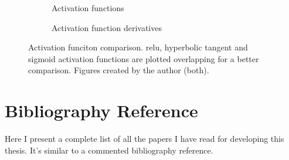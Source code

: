 \begin{figure}[p]
  \centering
  \begin{subfigure}[b]{.475\textwidth}
    \centering
    \caption{Activation functions}
  \end{subfigure}\hfill
  \begin{subfigure}[b]{.475\textwidth}
    \centering
    \caption{Activation function derivatives}
  \end{subfigure}
  \caption[Activation funciton comparison]{Activation funciton
    comparison. \Acf{relu}, hyperbolic tangent and sigmoid activation functions
    are plotted overlapping for a better comparison. Figures created by the
    author (both).}%
  \label{fig:activation-functions}
\end{figure}



















\section{Bibliography Reference}


Here I present a complete list of all the papers I have read for developing
this thesis. It's similar to a commented bibliography reference.
